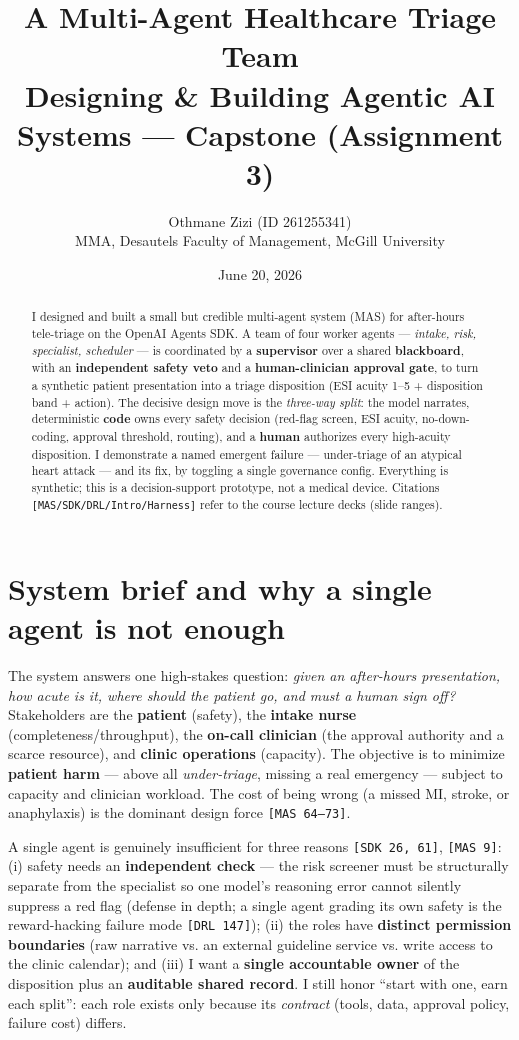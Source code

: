 \documentclass[11pt]{article}
\title{\vspace{-2.5em}\textbf{A Multi-Agent Healthcare Triage Team}\\[0.2em]
\large Designing \& Building Agentic AI Systems --- Capstone (Assignment 3)}
\author{Othmane Zizi \quad(ID 261255341)\\ \small MMA, Desautels Faculty of Management, McGill University}
\date{June 20, 2026}
\newcommand{\code}[1]{\texttt{#1}}
\begin{document}
\maketitle
\vspace{-1.5em}

\begin{abstract}
\noindent I designed and built a small but credible multi-agent system (MAS) for after-hours
tele-triage on the OpenAI Agents SDK. A team of four worker agents --- \emph{intake, risk,
specialist, scheduler} --- is coordinated by a \textbf{supervisor} over a shared
\textbf{blackboard}, with an \textbf{independent safety veto} and a \textbf{human-clinician
approval gate}, to turn a synthetic patient presentation into a triage disposition (ESI acuity
1--5 + disposition band + action). The decisive design move is the \emph{three-way split}: the
model narrates, deterministic \textbf{code} owns every safety decision (red-flag screen, ESI
acuity, no-down-coding, approval threshold, routing), and a \textbf{human} authorizes every
high-acuity disposition. I demonstrate a named emergent failure --- under-triage of an atypical
heart attack --- and its fix, by toggling a single governance config. Everything is synthetic;
this is a decision-support prototype, not a medical device. Citations \code{[MAS/SDK/DRL/Intro/Harness]}
refer to the course lecture decks (slide ranges).
\end{abstract}

\section{System brief and why a single agent is not enough}
The system answers one high-stakes question: \emph{given an after-hours presentation, how acute
is it, where should the patient go, and must a human sign off?} Stakeholders are the
\textbf{patient} (safety), the \textbf{intake nurse} (completeness/throughput), the
\textbf{on-call clinician} (the approval authority and a scarce resource), and \textbf{clinic
operations} (capacity). The objective is to minimize \textbf{patient harm} --- above all
\emph{under-triage}, missing a real emergency --- subject to capacity and clinician workload.
The cost of being wrong (a missed MI, stroke, or anaphylaxis) is the dominant design force
\code{[MAS 64--73]}.

A single agent is genuinely insufficient for three reasons \code{[SDK 26, 61]}, \code{[MAS 9]}:
(i) safety needs an \textbf{independent check} --- the risk screener must be structurally
separate from the specialist so one model's reasoning error cannot silently suppress a red flag
(defense in depth; a single agent grading its own safety is the reward-hacking failure mode
\code{[DRL 147]}); (ii) the roles have \textbf{distinct permission boundaries} (raw narrative vs.
an external guideline service vs. write access to the clinic calendar); and (iii) I want a
\textbf{single accountable owner} of the disposition plus an \textbf{auditable shared record}. I
still honor ``start with one, earn each split'': each role exists only because its
\emph{contract} (tools, data, approval policy, failure cost) differs.
\end{document}
